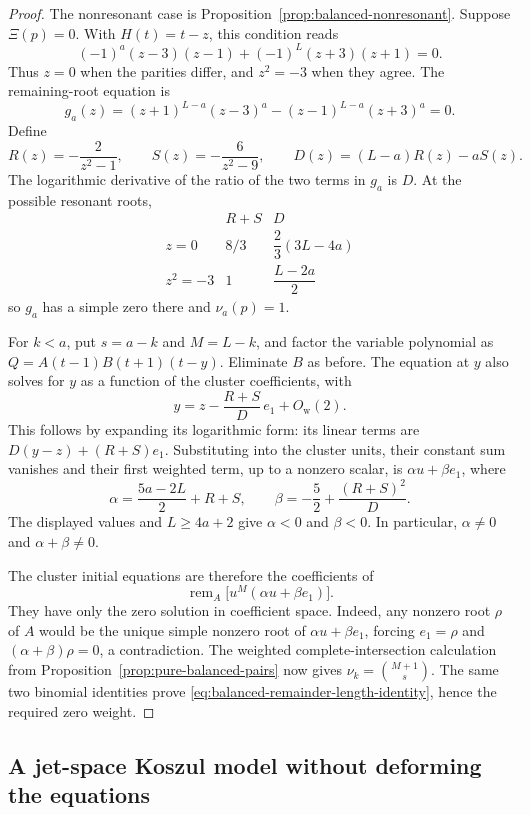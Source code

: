\documentclass[11pt]{article}
\theoremstyle{definition}
\begin{document}
\begin{proof}
The nonresonant case is Proposition~\ref{prop:balanced-nonresonant}.
Suppose $\Xi(p)=0$. With $H(t)=t-z$, this condition reads
\[
 (-1)^a(z-3)(z-1)+(-1)^L(z+3)(z+1)=0.
\]
Thus $z=0$ when the parities differ, and $z^2=-3$ when they agree.
The remaining-root equation is
\[
 g_a(z)=(z+1)^{L-a}(z-3)^a-(z-1)^{L-a}(z+3)^a=0.
\]
Define
\[
 R(z)=-\frac2{z^2-1},\qquad S(z)=-\frac6{z^2-9},\qquad
 D(z)=(L-a)R(z)-aS(z).
\]
The logarithmic derivative of the ratio of the two terms in $g_a$
is $D$. At the possible resonant roots,
\[
 \begin{array}{c|c|c}
 &R+S&D\\ \hline
 z=0&8/3&\dfrac23(3L-4a)\\[4pt]
 z^2=-3&1&\dfrac{L-2a}{2}
 \end{array}
\]
so $g_a$ has a simple zero there and $\nu_a(p)=1$.

For $k<a$, put $s=a-k$ and $M=L-k$, and factor the variable
polynomial as $Q=A(t-1)B(t+1)(t-y)$. Eliminate $B$ as before.
The equation at $y$ also solves for $y$ as a function of the cluster
coefficients, with
\[
 y=z-\frac{R+S}{D}\,e_1+O_{\mathrm w}(2).
\]
This follows by expanding its logarithmic form: its linear terms are
$D(y-z)+(R+S)e_1$. Substituting into the cluster units, their
constant sum vanishes and their first weighted term, up to a nonzero
scalar, is $\alpha u+\beta e_1$, where
\[
 \alpha=\frac{5a-2L}{2}+R+S,\qquad
 \beta=-\frac52+\frac{(R+S)^2}{D}.
\]
The displayed values and $L\ge4a+2$ give $\alpha<0$ and $\beta<0$.
In particular, $\alpha\ne0$ and $\alpha+\beta\ne0$.

The cluster initial equations are therefore the coefficients of
\[
 \operatorname{rem}_A\bigl[u^M(\alpha u+\beta e_1)\bigr].
\]
They have only the zero solution in coefficient space. Indeed, any
nonzero root $\rho$ of $A$ would be the unique simple nonzero root
of $\alpha u+\beta e_1$, forcing $e_1=\rho$ and
$(\alpha+\beta)\rho=0$, a contradiction. The weighted
complete-intersection calculation from
Proposition~\ref{prop:pure-balanced-pairs} now gives
$\nu_k=\binom{M+1}s$. The same two binomial identities prove
\eqref{eq:balanced-remainder-length-identity}, hence the required
zero weight.
\end{proof}

\subsection{A jet-space Koszul model without deforming the equations}
\label{sec:jet-koszul-model}
\end{document}
